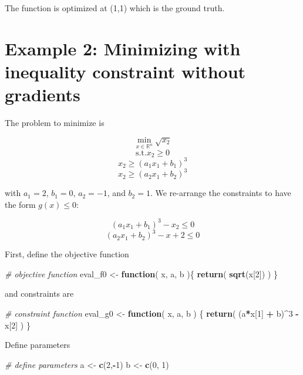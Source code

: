 \documentclass[onecolumn]{article}
\newenvironment{Shaded}{\begin{snugshade}}{\end{snugshade}}
\newcommand{\KeywordTok}[1]{\textcolor[rgb]{0.13,0.29,0.53}{\textbf{#1}}}
\newcommand{\DecValTok}[1]{\textcolor[rgb]{0.00,0.00,0.81}{#1}}
\newcommand{\StringTok}[1]{\textcolor[rgb]{0.31,0.60,0.02}{#1}}
\newcommand{\CommentTok}[1]{\textcolor[rgb]{0.56,0.35,0.01}{\textit{#1}}}
\newcommand{\ControlFlowTok}[1]{\textcolor[rgb]{0.13,0.29,0.53}{\textbf{#1}}}
\newcommand{\OperatorTok}[1]{\textcolor[rgb]{0.81,0.36,0.00}{\textbf{#1}}}
\newcommand{\NormalTok}[1]{#1}
\begin{document}
The function is optimized at (1,1) which is the ground truth.

\section{Example 2: Minimizing with inequality constraint without
gradients}\label{example-2-minimizing-with-inequality-constraint-without-gradients}

The problem to minimize is

\[
\min_{x\in \mathbb{R}^n} \sqrt{x_2}
\] \[
\text{s.t.} x_2 \geq 0\] \[
x_2 \geq (a_1x_1 + b_1)^3\] \[
x_2 \geq  (a_2 x_1 + b_2)^3
\]

with \(a_1 = 2\), \(b_1 = 0\), \(a_2 = -1\), and \(b_2 = 1\). We
re-arrange the constraints to have the form \(g(x) \leq 0\):

\[
(a_1x_1 + b_1)^3 - x_2 \leq 0
\] \[
(a_2 x_1 + b_2)^3 - x+2 \leq 0
\]

First, define the objective function

\begin{Shaded}
\begin{Highlighting}[]
\CommentTok{# objective function}
\NormalTok{eval_f0 <-}\StringTok{ }\ControlFlowTok{function}\NormalTok{( x, a, b )\{}
\KeywordTok{return}\NormalTok{( }\KeywordTok{sqrt}\NormalTok{(x[}\DecValTok{2}\NormalTok{]) )}
\NormalTok{\}}
\end{Highlighting}
\end{Shaded}

and constraints are

\begin{Shaded}
\begin{Highlighting}[]
\CommentTok{# constraint function}
\NormalTok{eval_g0 <-}\StringTok{ }\ControlFlowTok{function}\NormalTok{( x, a, b ) \{}
\KeywordTok{return}\NormalTok{( (a}\OperatorTok{*}\NormalTok{x[}\DecValTok{1}\NormalTok{] }\OperatorTok{+}\StringTok{ }\NormalTok{b)}\OperatorTok{^}\DecValTok{3} \OperatorTok{-}\StringTok{ }\NormalTok{x[}\DecValTok{2}\NormalTok{] )}
\NormalTok{\}}
\end{Highlighting}
\end{Shaded}

Define parameters

\begin{Shaded}
\begin{Highlighting}[]
\CommentTok{# define parameters}
\NormalTok{a <-}\StringTok{ }\KeywordTok{c}\NormalTok{(}\DecValTok{2}\NormalTok{,}\OperatorTok{-}\DecValTok{1}\NormalTok{)}
\NormalTok{b <-}\StringTok{ }\KeywordTok{c}\NormalTok{(}\DecValTok{0}\NormalTok{, }\DecValTok{1}\NormalTok{)}
\end{Highlighting}
\end{Shaded}
\end{document}
